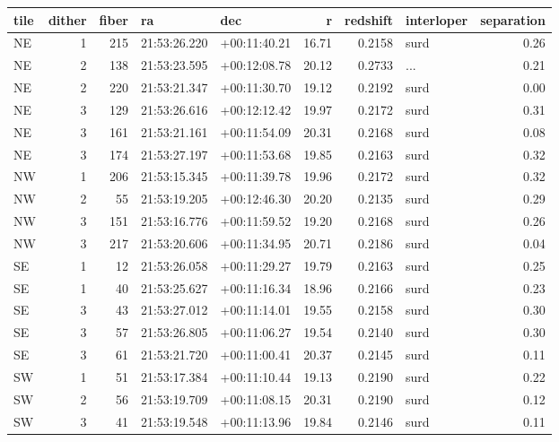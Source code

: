 \begin{tabular}{lrrllrrlr}
\toprule
tile &  dither &  fiber &            ra &           dec &      r &  redshift & interloper &  separation \\
\midrule
  NE &       1 &    215 &  21:53:26.220 &  +00:11:40.21 &  16.71 &    0.2158 &       surd &        0.26 \\
  NE &       2 &    138 &  21:53:23.595 &  +00:12:08.78 &  20.12 &    0.2733 &        ... &        0.21 \\
  NE &       2 &    220 &  21:53:21.347 &  +00:11:30.70 &  19.12 &    0.2192 &       surd &        0.00 \\
  NE &       3 &    129 &  21:53:26.616 &  +00:12:12.42 &  19.97 &    0.2172 &       surd &        0.31 \\
  NE &       3 &    161 &  21:53:21.161 &  +00:11:54.09 &  20.31 &    0.2168 &       surd &        0.08 \\
  NE &       3 &    174 &  21:53:27.197 &  +00:11:53.68 &  19.85 &    0.2163 &       surd &        0.32 \\
  NW &       1 &    206 &  21:53:15.345 &  +00:11:39.78 &  19.96 &    0.2172 &       surd &        0.32 \\
  NW &       2 &     55 &  21:53:19.205 &  +00:12:46.30 &  20.20 &    0.2135 &       surd &        0.29 \\
  NW &       3 &    151 &  21:53:16.776 &  +00:11:59.52 &  19.20 &    0.2168 &       surd &        0.26 \\
  NW &       3 &    217 &  21:53:20.606 &  +00:11:34.95 &  20.71 &    0.2186 &       surd &        0.04 \\
  SE &       1 &     12 &  21:53:26.058 &  +00:11:29.27 &  19.79 &    0.2163 &       surd &        0.25 \\
  SE &       1 &     40 &  21:53:25.627 &  +00:11:16.34 &  18.96 &    0.2166 &       surd &        0.23 \\
  SE &       3 &     43 &  21:53:27.012 &  +00:11:14.01 &  19.55 &    0.2158 &       surd &        0.30 \\
  SE &       3 &     57 &  21:53:26.805 &  +00:11:06.27 &  19.54 &    0.2140 &       surd &        0.30 \\
  SE &       3 &     61 &  21:53:21.720 &  +00:11:00.41 &  20.37 &    0.2145 &       surd &        0.11 \\
  SW &       1 &     51 &  21:53:17.384 &  +00:11:10.44 &  19.13 &    0.2190 &       surd &        0.22 \\
  SW &       2 &     56 &  21:53:19.709 &  +00:11:08.15 &  20.31 &    0.2190 &       surd &        0.12 \\
  SW &       3 &     41 &  21:53:19.548 &  +00:11:13.96 &  19.84 &    0.2146 &       surd &        0.11 \\
\bottomrule
\end{tabular}
